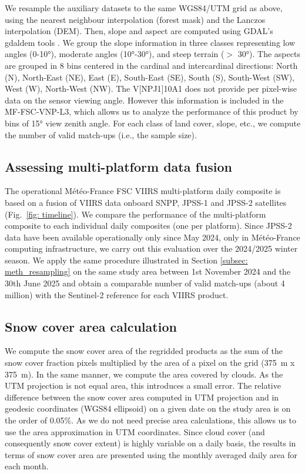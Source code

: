 \documentclass[tc, manuscript]{copernicus}
\begin{document}
We resample the auxiliary datasets to the same WGS84/UTM grid as above, using the nearest neighbour interpolation (forest mask) and the Lanczos interpolation (DEM). Then, slope and aspect are computed using GDAL's gdaldem tools \citep{gdal}. We group the slope information in three classes representing low angles (0-10°), moderate angles (10°-30°), and steep terrain ($>$ 30°). The aspects are grouped in 8 bins centered in the cardinal and intercardinal directions: North (N), North-East (NE), East (E), South-East (SE), South (S), South-West (SW), West (W), North-West (NW). The V[NP\textbar J1]10A1 does not provide per pixel-wise data on the sensor viewing angle. However this information is included in the MF-FSC-VNP-L3, which allows us to analyze the performance of this product by bins of 15° view zenith angle. For each class of land cover, slope, etc., we compute the number of valid match-ups (i.e., the sample size). 

\subsection{Assessing multi-platform data fusion}
\label{subsec: meth_compo}

The operational Météo-France FSC VIIRS multi-platform daily composite is based on a fusion of VIIRS data onboard SNPP, JPSS-1 and JPSS-2 satellites (Fig.~\ref{fig: timeline}).  We compare the performance of the multi-platform composite to each individual daily composites (one per platform). Since JPSS-2 data have been available operationally only since May 2024, only in Météo-France computing infrastructure, we carry out this evaluation over the 2024/2025 winter season. We apply the same procedure illustrated in Section \ref{subsec: meth_resampling} on the same study area between 1st November 2024 and the 30th June 2025 and obtain a comparable number of valid match-ups (about 4 million) with the Sentinel-2 reference for each VIIRS product. 

\subsection{Snow cover area calculation}

We compute the snow cover area of the regridded products as the sum of the snow cover fraction pixels multiplied by the area of a pixel on the grid (375~m x 375~m). In the same manner, we compute the area covered by clouds. As the UTM projection is not equal area, this introduces a small error. The relative difference between the snow cover area computed in UTM projection and in geodesic coordinates (WGS84 ellipsoid) on a given date on the study area is on the order of  0.05\%. As we do not need precise area calculations, this allows us to use the area approximation in UTM coordinates. Since cloud cover (and consequently snow cover extent) is highly variable on a daily basis, the results in terms of snow cover area are presented using the monthly averaged daily area for each month.
\end{document}
